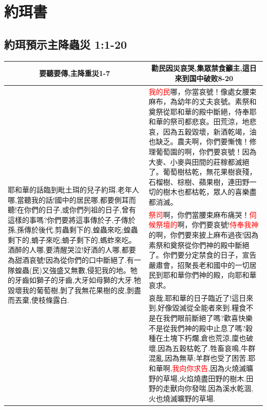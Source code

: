 \chapter{約珥書}

\section{約珥預示主降蟲災 1:1-20}

\begin{table}[H]
\centering 
\begin{tabular}{p{15.3em}|p{33.8em}}\toprule 
\multicolumn{1}{c|}{要聽要傳,主降重災1-7}&\multicolumn{1}{c}{勸民因災哀哭,集眾禁食籲主,這日來到国中破败8-20}\\\hline
\multirow{3}{15.9em}{耶和華的話臨到毗土珥的兒子約珥.老年人哪,當聽我的話!國中的居民哪,都要側耳而聽!在你們的日子,或你們列祖的日子,曾有這樣的事嗎?你們要將這事傳於子,子傳於孫,孫傳於後代.剪蟲剩下的,蝗蟲來吃;蝗蟲剩下的,蝻子來吃;蝻子剩下的,螞蚱來吃。酒醉的人哪,要清醒哭泣!好酒的人哪,都要為甜酒哀號!因為從你們的口中斷絕了.有一隊蝗蟲(民)又強盛又無數,侵犯我的地。牠的牙齒如獅子的牙齒,大牙如母獅的大牙.牠毀壞我的葡萄樹,剝了我無花果樹的皮,剝盡而丟棄,使枝條露白.}
&\textcolor{red}{我的民}哪，你當哀號！像處女腰束麻布，為幼年的丈夫哀號。素祭和奠祭從耶和華的殿中斷絕，侍奉耶和華的祭司都悲哀。田荒涼，地悲哀，因為五穀毀壞，新酒乾竭，油也缺乏。農夫啊，你們要慚愧！修理葡萄園的啊，你們要哀號！因為大麥、小麥與田間的莊稼都滅絕了。葡萄樹枯乾，無花果樹衰殘，石榴樹、棕樹、蘋果樹，連田野一切的樹木也都枯乾，眾人的喜樂盡都消滅。\\\cline{2-2}
&\textcolor{red}{祭司}啊，你們當腰束麻布痛哭！\textcolor{red}{伺候祭壇的}啊，你們要哀號!\textcolor{red}{侍奉我神}的啊，你們要來披上麻布過夜!因為素祭和奠祭從你們神的殿中斷絕了。你們要分定禁食的日子，宣告嚴肅會，招聚長老和國中的一切居民到耶和華你們神的殿，向耶和華哀求。\\\cline{2-2}
&哀哉,耶和華的日子臨近了!這日來到,好像毀滅從全能者來到.糧食不是在我們眼前斷絕了嗎?歡喜快樂不是從我們神的殿中止息了嗎?穀種在土塊下朽爛,倉也荒涼,廩也破壞,因為五穀枯乾了.牲畜哀鳴,牛群混亂,因為無草;羊群也受了困苦.耶和華啊,\textcolor{red}{我向你求告},因為火燒滅曠野的草場,火焰燒盡田野的樹木.田野的走獸向你發喘,因為溪水乾涸,火也燒滅曠野的草場.\\ \bottomrule
\end{tabular} 
\end{table}

